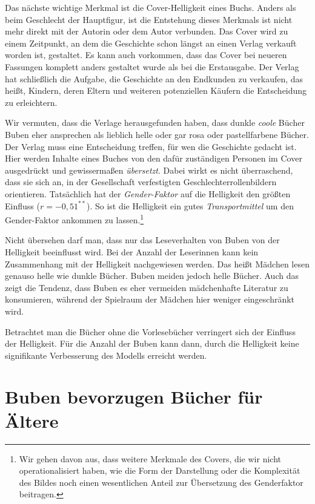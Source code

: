 Das nächste wichtige Merkmal ist die Cover-Helligkeit eines Buchs.
Anders als beim Geschlecht der Hauptfigur, ist die Entstehung dieses
Merkmals ist nicht mehr direkt mit der Autorin oder dem Autor verbunden.
Das Cover wird zu einem Zeitpunkt, an dem die Geschichte schon längst an
einen Verlag verkauft worden ist, gestaltet. Es kann auch vorkommen,
dass das Cover bei neueren Fassungen komplett anders gestaltet wurde als
bei die Erstausgabe. Der Verlag hat schließlich die Aufgabe, die
Geschichte an den Endkunden zu verkaufen, das heißt, Kindern, deren
Eltern und weiteren potenziellen Käufern die Entscheidung zu
erleichtern.

Wir vermuten, dass die Verlage herausgefunden haben, dass dunkle
\emph{coole} Bücher Buben eher ansprechen als lieblich helle oder gar
rosa oder pastellfarbene Bücher. Der Verlag muss eine Entscheidung
treffen, für wen die Geschichte gedacht ist. Hier werden Inhalte eines
Buches von den dafür zuständigen Personen im Cover ausgedrückt und
gewissermaßen \emph{übersetzt}. Dabei wirkt es nicht überraschend, dass
sie sich an, in der Gesellschaft verfestigten Geschlechterrollenbildern
orientieren. Tatsächlich hat der \emph{Gender-Faktor} auf die Helligkeit
den größten Einfluss ($r=-0{,}51^{**}$). So ist die Helligkeit ein gutes
\emph{Transportmittel} um den Gender-Faktor ankommen zu
lassen.\footnote{Wir gehen davon aus, dass weitere Merkmale des Covers, die wir nicht operationalisiert haben, wie die Form der Darstellung oder die Komplexität des Bildes noch einen wesentlichen Anteil zur Übersetzung des Genderfaktor beitragen.}

Nicht übersehen darf man, dass nur das Leseverhalten von Buben von der
Helligkeit beeinflusst wird. Bei der Anzahl der Leserinnen kann kein
Zusammenhang mit der Helligkeit nachgewiesen werden. Das heißt Mädchen
lesen genauso helle wie dunkle Bücher. Buben meiden jedoch helle Bücher.
Auch das zeigt die Tendenz, dass Buben es eher vermeiden mädchenhafte
Literatur zu konsumieren, während der Spielraum der Mädchen hier weniger
eingeschränkt wird.

Betrachtet man die Bücher ohne die Vorlesebücher verringert sich der
Einfluss der Helligkeit. Für die Anzahl der Buben kann dann, durch die
Helligkeit keine signifikante Verbesserung des Modells erreicht werden.

\section{Buben bevorzugen Bücher für Ältere}


